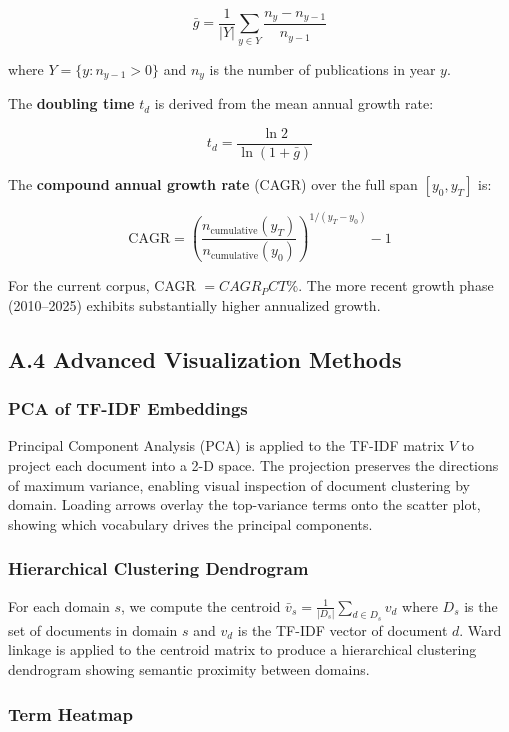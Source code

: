 \documentclass[
]{article}
\begin{document}
\[
\bar{g} = \frac{1}{|Y|} \sum_{y \in Y} \frac{n_y - n_{y-1}}{n_{y-1}}
\]

where \(Y = \{y : n_{y-1} > 0\}\) and \(n_y\) is the number of
publications in year \(y\).

The \textbf{doubling time} \(t_d\) is derived from the mean annual
growth rate:

\[
t_d = \frac{\ln 2}{\ln(1 + \bar{g})}
\]

The \textbf{compound annual growth rate} (CAGR) over the full span
\([y_0, y_T]\) is:

\[
\text{CAGR} = \left(\frac{n_{\text{cumulative}}(y_T)}{n_{\text{cumulative}}(y_0)}\right)^{1/(y_T - y_0)} - 1
\]

For the current corpus, CAGR \(= {{CAGR_PCT}}\%\). The more recent
growth phase (2010--2025) exhibits substantially higher annualized
growth.

\subsection{A.4 Advanced Visualization
Methods}\label{a.4-advanced-visualization-methods}

\subsubsection{PCA of TF-IDF Embeddings}\label{pca-of-tf-idf-embeddings}

Principal Component Analysis (PCA) is applied to the TF-IDF matrix \(V\)
to project each document into a 2-D space. The projection preserves the
directions of maximum variance, enabling visual inspection of document
clustering by domain. Loading arrows overlay the top-variance terms onto
the scatter plot, showing which vocabulary drives the principal
components.

\subsubsection{Hierarchical Clustering
Dendrogram}\label{hierarchical-clustering-dendrogram}

For each domain \(s\), we compute the centroid
\(\bar{v}_s = \frac{1}{|D_s|} \sum_{d \in D_s} v_d\) where \(D_s\) is
the set of documents in domain \(s\) and \(v_d\) is the TF-IDF vector of
document \(d\). Ward linkage is applied to the centroid matrix to
produce a hierarchical clustering dendrogram showing semantic proximity
between domains.

\subsubsection{Term Heatmap}\label{term-heatmap}
\end{document}
